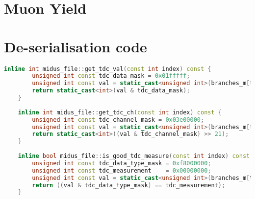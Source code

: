 \documentclass[]{article}
\begin{document}
\section{Muon Yield} %
\label{sec:muon_yield}

\appendix
\section{De-serialisation code} %
\label{app:deserialisation}

\begin{center}
	\begin{lstlisting}[caption={Functions used for de-serialising CAEN V1290N \ref{REF FOR THE DATA SHEET} MTDC  output, written in C++}, language=C++, float=htbp]
    inline int midus_file::get_tdc_val(const int index) const {
        unsigned int const tdc_data_mask = 0x01fffff;
        unsigned int const val = static_cast<unsigned int>(branches_m[tdc_i].data[index]);
        return static_cast<int>(val & tdc_data_mask);
    }
    
    inline int midus_file::get_tdc_ch(const int index) const {
        unsigned int const tdc_channel_mask = 0x03e00000;
        unsigned int const val = static_cast<unsigned int>(branches_m[tdc_i].data[index]);
        return static_cast<int>((val & tdc_channel_mask) >> 21);
    }
    
    inline bool midus_file::is_good_tdc_measure(const int index) const {
        unsigned int const tdc_data_type_mask = 0xf8000000;
        unsigned int const tdc_measurement    = 0x00000000;
        unsigned int const val = static_cast<unsigned int>(branches_m[tdc_i].data[index]);
        return ((val & tdc_data_type_mask) == tdc_measurement);
    }
	\end{lstlisting}
\end{center}
\end{document}
